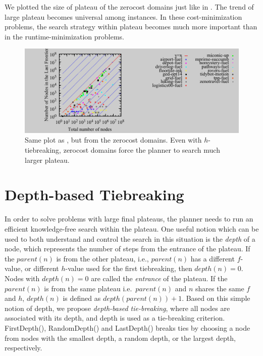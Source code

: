 We plotted the size of plateau of the zerocost domains just like in
. The trend of large plateau becomes universal among
instances. In these cost-minimization problems, the search strategy within
plateau becomes much more important than in the
runtime-minimization problems.

\begin{figure}[tb]
 \centering {}
  \includegraphics{tables/aaai16-frontier/zerocost/lmcut_frontier-front.pdf}
  \caption{Same plot as , but from the zerocost
  domains. Even with $h$-tiebreaking, zerocost domains force the planner
  to search much larger plateau.}
 \label{plateau-zerocost}
\end{figure}



\section{Depth-based Tiebreaking}

In order to solve problems with large final plateaus, the
planner needs to run an efficient knowledge-free search within the
plateau.  One useful notion which can be used to both understand and control the search in this
situation is the \emph{depth} of a node, which represents the number 
of steps from the entrance of the plateau.
If the $parent(n)$ is from the other plateau, i.e., $parent(n)$ has a
different $f$-value, or different $h$-value used for the first
tiebreaking, then $depth(n) = 0$. Nodes with $depth(n) = 0$ are called
the \emph{entrance} of the plateau.
If the $parent(n)$ is from the same plateau i.e.\ $parent(n)$ and $n$
shares the same $f$ and $h$,
$depth(n)$ is defined as $depth(parent(n)) + 1$.
Based on this simple notion of depth,
we propose  \emph{depth-based tie-breaking}, where all nodes are associated with its depth, 
and depth is used as a tie-breaking criterion.
FirstDepth(\fd), RandomDepth(\rd) and LastDepth(\ld) breaks ties by choosing a node from 
nodes with the smallest depth, a random depth, or the largest depth, respectively.

